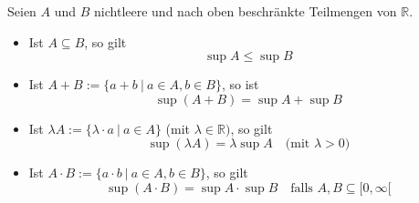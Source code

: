 Seien $A$ und $B$ nichtleere und nach oben beschränkte Teilmengen von $\mathbb{R}$.
\begin{itemize}
    \item Ist $A \subseteq B$, so gilt 
    $$\sup A \leq \sup B$$
    \item Ist $A+B := \{a + b \ | \ a \in A, b \in B\}$, so ist
    $$\sup(A+B) = \sup A + \sup B$$
    \item Ist $\lambda A := \{\lambda \cdot a \ | \ a \in A\}$ (mit $\lambda \in \mathbb{R})$, so gilt
    $$\sup(\lambda A) = \lambda \sup A \quad \text{(mit $\lambda > 0$)}$$
    \item Ist $A \cdot B := \{a \cdot b \ | \ a \in A, b \in B\}$, so gilt
    $$\sup(A \cdot B) = \sup A \cdot \sup B \quad \text{falls $A, B \subseteq [0, \infty[$}$$
\end{itemize}